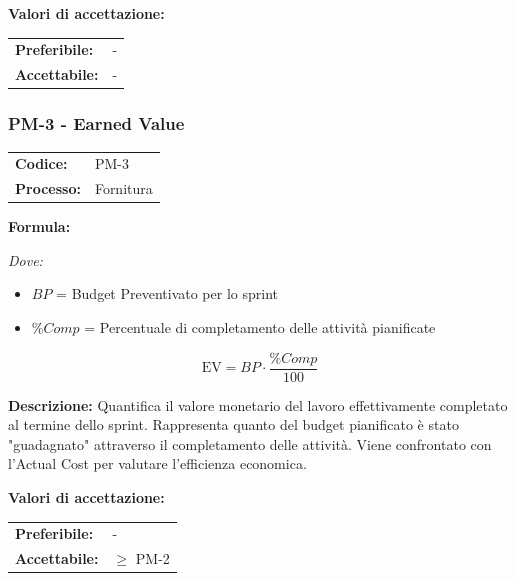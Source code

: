 \documentclass[a4paper,11pt,oneside]{scrartcl}
\begin{document}
\vspace{0.2cm}
\noindent\textbf{Valori di accettazione:}
\vspace{0.1cm}

\noindent
\begin{tabular}{@{}ll@{}}
    \textbf{Preferibile:} & - \\
    \textbf{Accettabile:} & - \\
\end{tabular}

\subsubsection{PM-3 - Earned Value}

\noindent
\begin{tabular}{@{}p{}p{}@{}}
    \textbf{Codice:}   & PM-3      \\
    \textbf{Processo:} & Fornitura \\
\end{tabular}

\vspace{0.3cm}
\noindent\textbf{Formula:}

\noindent\textit{Dove:}
\begin{itemize}[leftmargin=1.5cm, topsep=0pt, itemsep=0pt]
    \item $BP$ = Budget Preventivato per lo sprint
    \item $\%Comp$ = Percentuale di completamento delle attività pianificate
\end{itemize}

\[
    \text{EV} = BP \cdot \frac{\%Comp}{100}
\]

\noindent\textbf{Descrizione:} Quantifica il valore monetario del lavoro effettivamente completato al termine dello sprint. Rappresenta quanto del budget pianificato è stato "guadagnato" attraverso il completamento delle attività. Viene confrontato con l'Actual Cost per valutare l'efficienza economica.

\vspace{0.2cm}
\noindent\textbf{Valori di accettazione:}
\vspace{0.1cm}

\noindent
\begin{tabular}{@{}ll@{}}
    \textbf{Preferibile:} & -           \\
    \textbf{Accettabile:} & $\geq$ PM-2 \\
\end{tabular}
\end{document}

